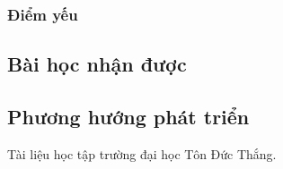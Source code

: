 \documentclass[12pt,a4paper,2sides]{report}
\begin{document}
\subsubsection{Điểm yếu}

\subsection{Bài học nhận được}

\subsection{Phương hướng phát triển}



\begin{thebibliography}{5}
	\bibitem{} Tài liệu học tập trường đại học Tôn Đức Thắng.
	\bibitem{}
	\bibitem{}
\end{thebibliography}
\end{document}
